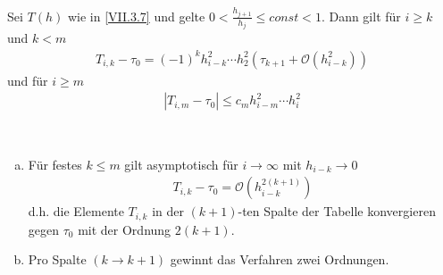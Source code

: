 \begin{Satze}\label{7.3.9}
  Sei $T(h)$ wie in \eqref{VII.3.7}
  und gelte $0<\frac{h_{j+1}}{h_j}\leq const<1$.
  Dann gilt für $i\geq k$ und $k<m$
  \begin{gather}
    T_{i,k}-\tau_0=(-1)^kh_{i-k}^2
    \dotsm h_2^2\left(\tau_{k+1}+\mathcal{O}(h_{i-k}^2)\right)
    \label{VII.3.11}
  \end{gather}
  und für $i\geq m$
  \begin{gather}
    \left| T_{i,m}-\tau_0 \right| \leq c_mh_{i-m}^2\dotsm h_i^2
    \label{VII.3.12}
  \end{gather}
\end{Satze}

\begin{Kore}~
  \begin{enumerate}[a)]
  \item Für festes $k\leq m $ gilt asymptotisch 
    für $i\to \infty$ mit $h_{i-k}\to 0$
    \begin{gather}
      T_{i,k}-\tau_0 = \mathcal{O}\left(h_{i-k}^{2(k+1)}\right)
      \label{VII.3.13}
    \end{gather}
    d.h. die Elemente $T_{i,k}$ in der $(k+1)$-ten Spalte der Tabelle
    konvergieren gegen $\tau_0$ mit der Ordnung $2(k+1)$.
  \item Pro Spalte $(k \rightarrow k+1)$ 
    gewinnt das Verfahren zwei Ordnungen.
  \end{enumerate}

\end{Kore}

